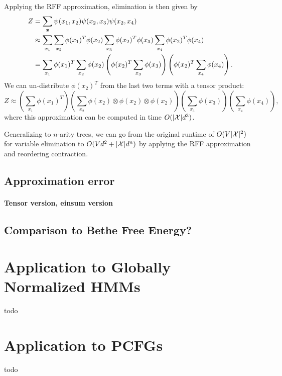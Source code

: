 \documentclass{article}
\begin{document}
Applying the RFF approximation, elimination is then given by
\begin{equation}
\begin{aligned}
Z &= \sum_{\mathbf{z}} \psi(x_1, x_2) \psi(x_2, x_3) \psi(x_2, x_4) \\
&\approx \sum_{x_1} \sum_{x_2} \phi(x_1)^T\phi(x_2)
    \sum_{x_3} \phi(x_2)^T\phi(x_3) \sum_{x_4} \phi(x_2)^T\phi(x_4)\\
&= \sum_{x_1} \phi(x_1)^T \sum_{x_2} \phi(x_2)
    \left(\phi(x_2)^T \sum_{x_3} \phi(x_3)\right)
    \left(\phi(x_2)^T\sum_{x_4} \phi(x_4)\right).
\end{aligned}
\end{equation}
We can un-distribute $\phi(x_2)^T$ from the last two terms with a tensor product:
\begin{equation}
Z \approx \left(\sum_{x_1} \phi(x_1)^T \right)
\left(\sum_{x_2} \phi(x_2) \otimes\phi(x_2) \otimes \phi(x_2)  \right)
\left(\sum_{x_3} \phi(x_3)\right) 
\left(\sum_{x_4} \phi(x_4)\right),
\end{equation}
where this approximation can be computed in time $O(|\mathcal{X}|d^3)$.

Generalizing to $n$-arity trees, we can go from the original runtime of $O(V|\mathcal{X}|^2)$
for variable elimination to $O(Vd^2 + |\mathcal{X}|d^n)$ by applying the
RFF approximation and reordering contraction.

\subsection{Approximation error}

\paragraph{Tensor version, einsum version}

\subsection{Comparison to Bethe Free Energy?}

\section{Application to Globally Normalized HMMs}
todo

\section{Application to PCFGs}
todo



\end{document}
